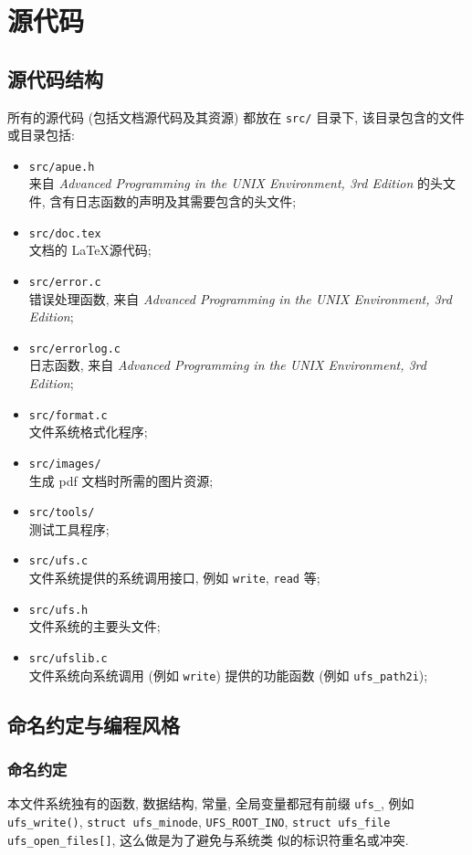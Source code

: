 \documentclass[nofonts, titlepage]{ctexart}
\begin{document}
\section{源代码}
\subsection{源代码结构}
所有的源代码 (包括文档源代码及其资源) 都放在 \verb'src/' 目录下,
该目录包含的文件或目录包括:
\begin{itemize}
    \item \verb'src/apue.h'     \\
        来自 \textit{Advanced Programming in the UNIX Environment, 3rd Edition}
        的头文件, 含有日志函数的声明及其需要包含的头文件;
    \item \verb'src/doc.tex' \\
        文档的 \LaTeX 源代码;
    \item \verb'src/error.c' \\
        错误处理函数, 来自 \textit{Advanced Programming in the UNIX
        Environment, 3rd Edition};
    \item \verb'src/errorlog.c' \\
        日志函数, 来自 \textit{Advanced Programming in the UNIX
        Environment, 3rd Edition};
    \item \verb'src/format.c' \\
        文件系统格式化程序;
    \item \verb'src/images/' \\
        生成 pdf 文档时所需的图片资源;
    \item \verb'src/tools/' \\
        测试工具程序;
    \item \verb'src/ufs.c' \\
        文件系统提供的系统调用接口, 例如 \verb'write', \verb'read' 等;
    \item \verb'src/ufs.h' \\
        文件系统的主要头文件;
    \item \verb'src/ufslib.c' \\
        文件系统向系统调用 (例如 \verb'write') 提供的功能函数 (例如 
        \verb'ufs_path2i');
\end{itemize}

\subsection{命名约定与编程风格}
\subsubsection{命名约定}
本文件系统独有的函数, 数据结构, 常量, 全局变量都冠有前缀 \verb'ufs_',
例如 \verb'ufs_write()', \texttt{struct ufs\_minode}, \verb'UFS_ROOT_INO',
\texttt{struct ufs\_file ufs\_open\_files[]}, 这么做是为了避免与系统类
似的标识符重名或冲突.
\end{document}
